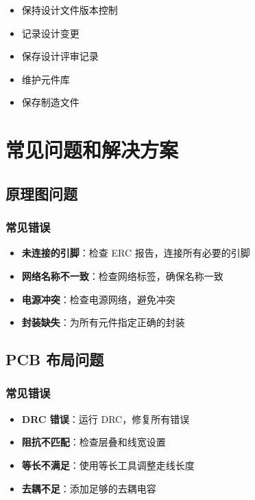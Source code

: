 \begin{itemize}
  \item 保持设计文件版本控制
  \item 记录设计变更
  \item 保存设计评审记录
  \item 维护元件库
  \item 保存制造文件
\end{itemize}

\section{常见问题和解决方案}

\subsection{原理图问题}

\subsubsection{常见错误}

\begin{itemize}
  \item \textbf{未连接的引脚}：检查 ERC 报告，连接所有必要的引脚
  \item \textbf{网络名称不一致}：检查网络标签，确保名称一致
  \item \textbf{电源冲突}：检查电源网络，避免冲突
  \item \textbf{封装缺失}：为所有元件指定正确的封装
\end{itemize}

\subsection{PCB 布局问题}

\subsubsection{常见错误}

\begin{itemize}
  \item \textbf{DRC 错误}：运行 DRC，修复所有错误
  \item \textbf{阻抗不匹配}：检查层叠和线宽设置
  \item \textbf{等长不满足}：使用等长工具调整走线长度
  \item \textbf{去耦不足}：添加足够的去耦电容
\end{itemize}

